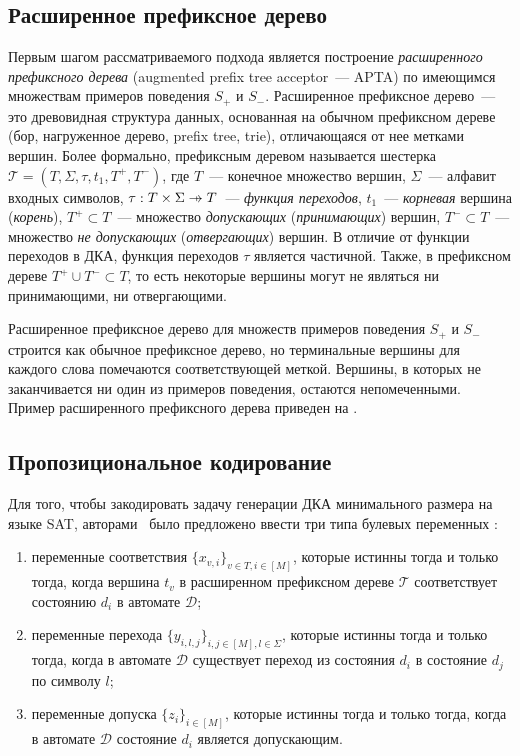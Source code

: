 \subsection{Расширенное префиксное дерево}
\label{sec:review:sat-dfa-inf:apta}
Первым шагом рассматриваемого подхода является построение \emph{расширенного префиксного дерева} (augmented prefix tree acceptor~{---} APTA) по имеющимся множествам примеров поведения $S_{+}$ и $S_{-}$. 
Расширенное префиксное дерево~--- это древовидная структура данных, основанная на обычном префиксном дереве (бор, нагруженное дерево, prefix tree, trie), отличающаяся от нее метками вершин.
Более формально, префиксным деревом называется шестерка $\mathcal{T} = \left(T,\Sigma,\tau,t_{1},T^{+}, T^{-}\right)$, где $T$~{---} конечное множество вершин, $\Sigma$~{---} алфавит входных символов, $\tau: T \times \Sigma \pto T$~{---} \emph{функция переходов}, $t_{1}$~{---} \emph{корневая} вершина (\emph{корень}), $T^{+} \subset T$~{---} множество \emph{допускающих} (\emph{принимающих}) вершин, $T^{-} \subset T$~{---} множество \emph{не допускающих} (\emph{отвергающих}) вершин.
В отличие от функции переходов в ДКА, функция переходов $\tau$ является частичной. 
Также, в префиксном дереве $T^{+} \cup T^{-} \subset T$, то есть некоторые вершины могут не являться ни принимающими, ни отвергающими. 

Расширенное префиксное дерево для множеств примеров поведения $S_{+}$ и $S_{-}$ строится как обычное префиксное дерево, но терминальные вершины для каждого слова помечаются соответствующей меткой. Вершины, в которых не заканчивается ни один из примеров поведения, остаются непомеченными. Пример расширенного префиксного дерева приведен на .

\subsection{Пропозициональное кодирование} \label{sec:review:sat-dfa-inf:hv-encoding}


Для того, чтобы закодировать задачу генерации ДКА минимального размера на языке SAT, авторами~\cite{heule-icgi10} было предложено ввести три типа булевых переменных :
\begin{enumerate}
  \item переменные соответствия $\{x_{v,i}\}_{v \in T, i \in \left[M\right]}$, которые истинны тогда и только тогда, когда вершина $t_{v}$ в расширенном префиксном дереве $\mathcal{T}$ соответствует состоянию $d_{i}$ в автомате $\mathcal{D}$;
  \item переменные перехода $\{y_{i,l,j}\}_{i,j \in \left[M\right],l \in \Sigma}$, которые истинны тогда и только тогда, когда в автомате $\mathcal{D}$ существует переход из состояния $d_{i}$ в состояние $d_{j}$ по символу $l$;
  \item переменные допуска $\{z_{i}\}_{i \in \left[M\right]}$, которые истинны тогда и только тогда, когда в автомате $\mathcal{D}$ состояние $d_{i}$ является допускающим.
\end{enumerate}

